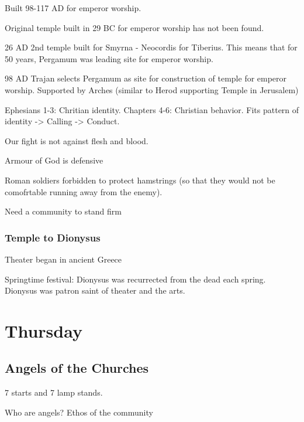 \documentclass[
]{book}
\begin{document}
Built 98-117 AD for emperor worship.

Original temple built in 29 BC for emperor worship has not been found.

26 AD 2nd temple built for Smyrna - Neocordis for Tiberius. This means that for 50 years, Pergamum was leading site for emperor worship.

98 AD Trajan selects Pergamum as site for construction of temple for emperor worship. Supported by Arches (similar to Herod supporting Temple in Jerusalem)

Ephesians 1-3: Chritian identity. Chapters 4-6: Christian behavior. Fits pattern of identity -\textgreater{} Calling -\textgreater{} Conduct.

Our fight is not against flesh and blood.

Armour of God is defensive

Roman soldiers forbidden to protect hamstrings (so that they would not be comofrtable running away from the enemy).

Need a community to stand firm

\hypertarget{temple-to-dionysus}{%
\subsection{Temple to Dionysus}\label{temple-to-dionysus}}

Theater began in ancient Greece

Springtime festival: Dionysus was recurrected from the dead each spring. Dionysus was patron saint of theater and the arts.

\hypertarget{section}{%
\subsubsection{}\label{section}}

\hypertarget{thursday}{%
\chapter{Thursday}\label{thursday}}

\hypertarget{angels-of-the-churches}{%
\section{Angels of the Churches}\label{angels-of-the-churches}}

7 starts and 7 lamp stands.

Who are angels? Ethos of the community
\end{document}
